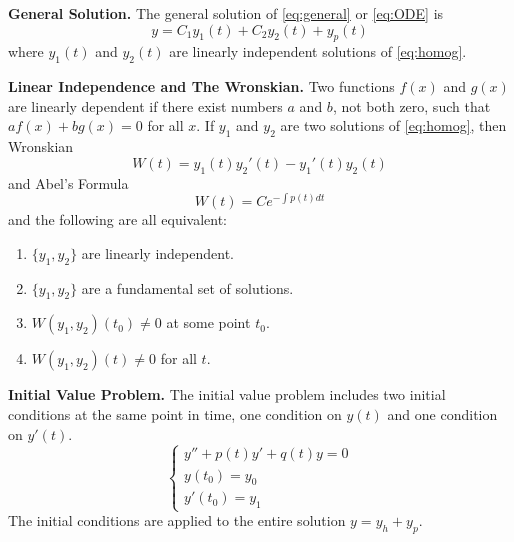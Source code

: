 \documentclass[../main.tex]{subfiles}
\begin{document}
    \textbf{General Solution.} The general solution of \eqref{eq:general} or \eqref{eq:ODE} is 
    \begin{equation}
    y = C_1 y_1(t) + C_2 y_2 (t) + y_p(t)
    \end{equation}
    where $y_1(t)$ and $y_2(t)$ are linearly independent solutions of \eqref{eq:homog}.
    
    \textbf{Linear Independence and The Wronskian.} Two functions $f(x)$ and $g(x)$ are linearly dependent if there exist numbers $a$ and $b$, not both zero, such that $af(x)+bg(x)=0$ for all $x$. If $y_1$ and $y_2$ are two solutions of \eqref{eq:homog}, then Wronskian
    \begin{equation*}
    W(t) = y_1(t) y_2'(t) - y_1'(t) y_2(t)
    \end{equation*}
    and Abel's Formula
    \begin{equation*}
    W(t) = Ce^{-\int{p(t)dt}}
    \end{equation*}
    and the following are all equivalent: 
    \begin{enumerate}
    \item $\{y_1,y_2\}$ are linearly independent.
    \item $\{y_1,y_2\}$ are a fundamental set of solutions.
    \item $W(y_1, y_2)(t_0)\neq 0$ at some point $t_0$.
    \item $W(y_1,y_2)(t) \neq 0$ for all $t$.
    \end{enumerate}
    
    
    \textbf{Initial Value Problem.} The initial value problem includes two initial conditions at the same point in time, one condition on $y(t)$ and one condition on $y'(t)$. 
    \begin{equation*}
    \left\{
    \begin{array}{l}
    y''+p(t)y'+q(t)y=0\\ y(t_0)=y_0 \\ y'(t_0)=y_1
    \end{array} 
    \right.
    \end{equation*}
    The initial conditions are applied to the entire solution $y=y_h+y_p$. 
    
\end{document}
